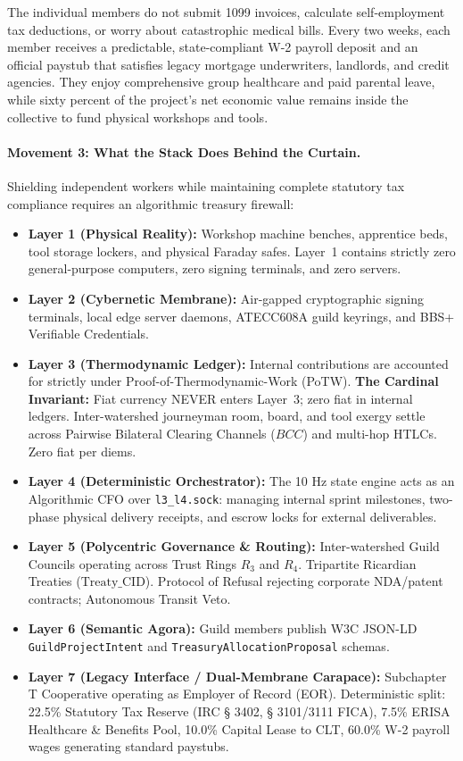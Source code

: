 The individual members do not submit 1099 invoices, calculate self-employment tax deductions, or worry about catastrophic medical bills. Every two weeks, each member receives a predictable, state-compliant W-2 payroll deposit and an official paystub that satisfies legacy mortgage underwriters, landlords, and credit agencies. They enjoy comprehensive group healthcare and paid parental leave, while sixty percent of the project's net economic value remains inside the collective to fund physical workshops and tools.

\paragraph{Movement 3: What the Stack Does Behind the Curtain.}
Shielding independent workers while maintaining complete statutory tax compliance requires an algorithmic treasury firewall:
\begin{itemize}
    \item \textbf{Layer 1 (Physical Reality):} Workshop machine benches, apprentice beds, tool storage lockers, and physical Faraday safes. Layer~1 contains strictly zero general-purpose computers, zero signing terminals, and zero servers.
    \item \textbf{Layer 2 (Cybernetic Membrane):} Air-gapped cryptographic signing terminals, local edge server daemons, ATECC608A guild keyrings, and BBS+ Verifiable Credentials.
    \item \textbf{Layer 3 (Thermodynamic Ledger):} Internal contributions are accounted for strictly under Proof-of-Thermodynamic-Work (PoTW). \textbf{The Cardinal Invariant:} Fiat currency NEVER enters Layer~3; zero fiat in internal ledgers. Inter-watershed journeyman room, board, and tool exergy settle across Pairwise Bilateral Clearing Channels ($BCC$) and multi-hop HTLCs. Zero fiat per diems.
    \item \textbf{Layer 4 (Deterministic Orchestrator):} The 10 Hz state engine acts as an Algorithmic CFO over \texttt{l3\_l4.sock}: managing internal sprint milestones, two-phase physical delivery receipts, and escrow locks for external deliverables.
    \item \textbf{Layer 5 (Polycentric Governance \& Routing):} Inter-watershed Guild Councils operating across Trust Rings $R_3$ and $R_4$. Tripartite Ricardian Treaties ($\mathrm{Treaty\_CID}$). Protocol of Refusal rejecting corporate NDA/patent contracts; Autonomous Transit Veto.
    \item \textbf{Layer 6 (Semantic Agora):} Guild members publish W3C JSON-LD \texttt{GuildProjectIntent} and \texttt{TreasuryAllocationProposal} schemas.
    \item \textbf{Layer 7 (Legacy Interface / Dual-Membrane Carapace):} Subchapter T Cooperative operating as Employer of Record (EOR). Deterministic split: 22.5\% Statutory Tax Reserve (IRC § 3402, § 3101/3111 FICA), 7.5\% ERISA Healthcare \& Benefits Pool, 10.0\% Capital Lease to CLT, 60.0\% W-2 payroll wages generating standard paystubs.
\end{itemize}

